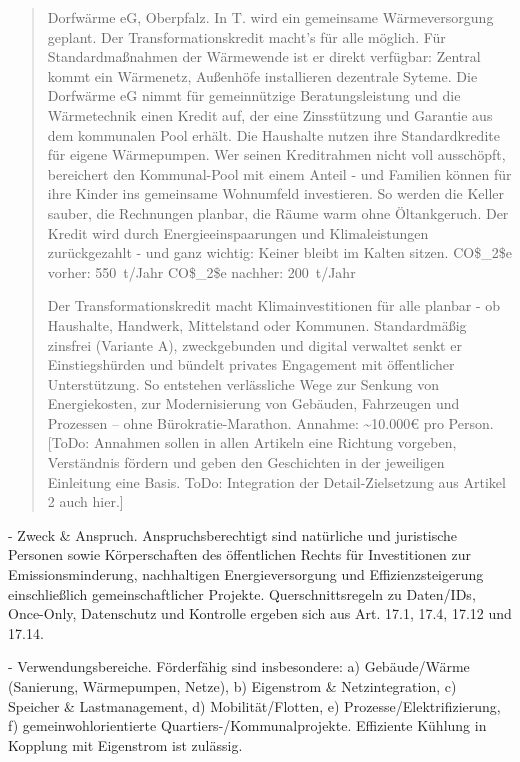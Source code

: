 \documentclass[12pt,a4paper]{scrartcl}
\begin{document}
\begin{quote}
Dorfwärme eG, Oberpfalz. In T. wird ein gemeinsame Wärmeversorgung geplant. Der Transformationskredit macht’s für alle möglich. Für Standardmaßnahmen der Wärmewende ist er direkt verfügbar: Zentral kommt ein Wärmenetz, Außenhöfe installieren dezentrale Syteme. Die Dorfwärme eG nimmt für gemeinnützige Beratungsleistung und die Wärmetechnik einen Kredit auf, der eine Zinsstützung und Garantie aus dem kommunalen Pool erhält. Die Haushalte nutzen ihre Standardkredite für eigene Wärmepumpen. Wer seinen Kreditrahmen nicht voll ausschöpft, bereichert den Kommunal-Pool mit einem Anteil - und Familien können für ihre Kinder ins gemeinsame Wohnumfeld investieren. So werden die Keller sauber, die Rechnungen planbar, die Räume warm ohne Öltankgeruch. Der Kredit wird durch Energieeinspaarungen und Klimaleistungen zurückgezahlt - und ganz wichtig: Keiner bleibt im Kalten sitzen. CO\$\_2\$e vorher: 550 t/Jahr CO\$\_2\$e nachher: 200 t/Jahr

  Der Transformationskredit macht Klimainvestitionen für alle planbar - ob Haushalte, Handwerk, Mittelstand oder Kommunen. Standardmäßig zinsfrei (Variante A), zweckgebunden und digital verwaltet senkt er Einstiegshürden und bündelt privates Engagement mit öffentlicher Unterstützung. So entstehen verlässliche Wege zur Senkung von Energiekosten, zur Modernisierung von Gebäuden, Fahrzeugen und Prozessen -- ohne Bürokratie-Marathon. Annahme: \textasciitilde{}10.000€ pro Person. [ToDo: Annahmen sollen in allen Artikeln eine Richtung vorgeben, Verständnis fördern und geben den Geschichten in der jeweiligen Einleitung eine Basis. ToDo: Integration der Detail-Zielsetzung aus Artikel 2 auch hier.]
\end{quote}

- Zweck \& Anspruch. Anspruchsberechtigt sind natürliche und juristische Personen sowie Körperschaften des öffentlichen Rechts für Investitionen zur Emissionsminderung, nachhaltigen Energieversorgung und Effizienzsteigerung einschließlich gemeinschaftlicher Projekte. Querschnittsregeln zu Daten/IDs, Once-Only, Datenschutz und Kontrolle ergeben sich aus Art. 17.1, 17.4, 17.12 und 17.14.

- Verwendungsbereiche. Förderfähig sind insbesondere: a) Gebäude/Wärme (Sanierung, Wärmepumpen, Netze), b) Eigenstrom \& Netzintegration, c) Speicher \& Lastmanagement, d) Mobilität/Flotten, e) Prozesse/Elektrifizierung, f) gemeinwohlorientierte Quartiers-/Kommunalprojekte. Effiziente Kühlung in Kopplung mit Eigenstrom ist zulässig.
\end{document}
